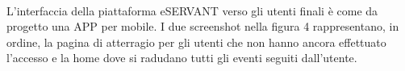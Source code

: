 \begin{figure}[htp]
\end{figure}

\paragraph{}
L’interfaccia della piattaforma eSERVANT verso gli utenti finali è come da progetto una APP per mobile.
I due screenshot nella figura 4 rappresentano, in ordine, la pagina di atterragio per gli utenti che
non hanno ancora effettuato l'accesso e la home dove si radudano tutti gli eventi seguiti dall'utente.

